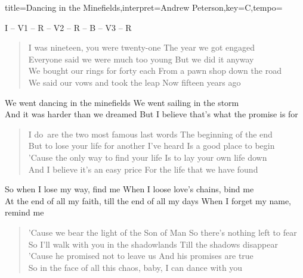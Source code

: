 \documentclass{leadsheet}
\begin{document}
\begin{song}{title={Dancing in the Minefields},interpret={Andrew Peterson},key={C},tempo={}}

\begin{schedule}
I -- V1 -- R -- V2 -- R -- B -- V3 -- R
\end{schedule}

\begin{verse}
I was nineteen, you were twenty-one
The year we got engaged \\
Everyone said we were much too young
But we did it anyway \\
We bought our rings for forty each
From a pawn shop down the road \\
We said our vows and took the leap
Now fifteen years ago
\end{verse}

\begin{chorus}
We went dancing in the minefields
We went sailing in the storm \\
And it was harder than we dreamed
But I believe that's what the promise is for
\end{chorus}

\begin{verse}
\frqq I do\flqq~are the two most famous last words
The beginning of the end \\
But to lose your life for another I've heard
Is a good place to begin \\
'Cause the only way to find your life
Is to lay your own life down \\
And I believe it's an easy price
For the life that we have found
\end{verse}

\begin{bridge}
So when I lose my way, find me
When I loose love's chains, bind me \\
At the end of all my faith, till the end of all my days
When I forget my name, remind me
\end{bridge}

\begin{verse}
'Cause we bear the light of the Son of Man
So there's nothing left to fear \\
So I'll walk with you in the shadowlands
Till the shadows disappear \\
'Cause he promised not to leave us
And his promises are true \\
So in the face of all this chaos, baby,
I can dance with you
\end{verse}


\end{song}
\end{document}
